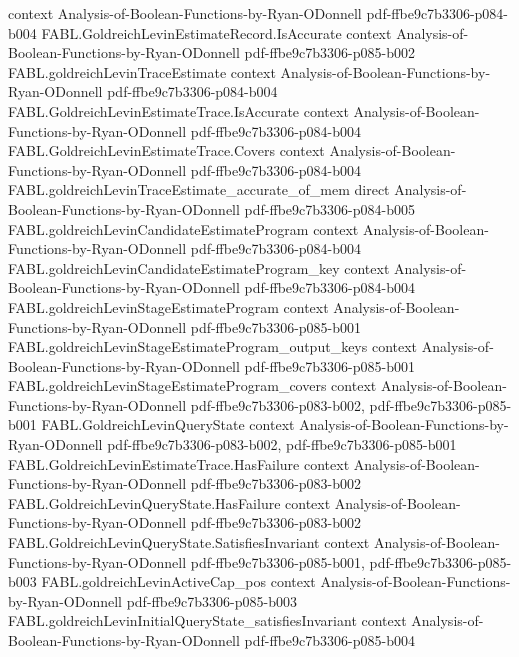 \begin{theorem}
  {context}
  {Analysis-of-Boolean-Functions-by-Ryan-ODonnell}
  {pdf-ffbe9c7b3306-p084-b004}
\proofstep
  {FABL.GoldreichLevinEstimateRecord.IsAccurate}
  {context}
  {Analysis-of-Boolean-Functions-by-Ryan-ODonnell}
  {pdf-ffbe9c7b3306-p085-b002}
\proofstep
  {FABL.goldreichLevinTraceEstimate}
  {context}
  {Analysis-of-Boolean-Functions-by-Ryan-ODonnell}
  {pdf-ffbe9c7b3306-p084-b004}
\proofstep
  {FABL.GoldreichLevinEstimateTrace.IsAccurate}
  {context}
  {Analysis-of-Boolean-Functions-by-Ryan-ODonnell}
  {pdf-ffbe9c7b3306-p084-b004}
\proofstep
  {FABL.GoldreichLevinEstimateTrace.Covers}
  {context}
  {Analysis-of-Boolean-Functions-by-Ryan-ODonnell}
  {pdf-ffbe9c7b3306-p084-b004}
\proofstep
  {FABL.goldreichLevinTraceEstimate_accurate_of_mem}
  {direct}
  {Analysis-of-Boolean-Functions-by-Ryan-ODonnell}
  {pdf-ffbe9c7b3306-p084-b005}
\proofstep
  {FABL.goldreichLevinCandidateEstimateProgram}
  {context}
  {Analysis-of-Boolean-Functions-by-Ryan-ODonnell}
  {pdf-ffbe9c7b3306-p084-b004}
\proofstep
  {FABL.goldreichLevinCandidateEstimateProgram_key}
  {context}
  {Analysis-of-Boolean-Functions-by-Ryan-ODonnell}
  {pdf-ffbe9c7b3306-p084-b004}
\proofstep
  {FABL.goldreichLevinStageEstimateProgram}
  {context}
  {Analysis-of-Boolean-Functions-by-Ryan-ODonnell}
  {pdf-ffbe9c7b3306-p085-b001}
\proofstep
  {FABL.goldreichLevinStageEstimateProgram_output_keys}
  {context}
  {Analysis-of-Boolean-Functions-by-Ryan-ODonnell}
  {pdf-ffbe9c7b3306-p085-b001}
\proofstep
  {FABL.goldreichLevinStageEstimateProgram_covers}
  {context}
  {Analysis-of-Boolean-Functions-by-Ryan-ODonnell}
  {pdf-ffbe9c7b3306-p083-b002,
    pdf-ffbe9c7b3306-p085-b001}
\proofstep
  {FABL.GoldreichLevinQueryState}
  {context}
  {Analysis-of-Boolean-Functions-by-Ryan-ODonnell}
  {pdf-ffbe9c7b3306-p083-b002,
    pdf-ffbe9c7b3306-p085-b001}
\proofstep
  {FABL.GoldreichLevinEstimateTrace.HasFailure}
  {context}
  {Analysis-of-Boolean-Functions-by-Ryan-ODonnell}
  {pdf-ffbe9c7b3306-p083-b002}
\proofstep
  {FABL.GoldreichLevinQueryState.HasFailure}
  {context}
  {Analysis-of-Boolean-Functions-by-Ryan-ODonnell}
  {pdf-ffbe9c7b3306-p083-b002}
\proofstep
  {FABL.GoldreichLevinQueryState.SatisfiesInvariant}
  {context}
  {Analysis-of-Boolean-Functions-by-Ryan-ODonnell}
  {pdf-ffbe9c7b3306-p085-b001,
    pdf-ffbe9c7b3306-p085-b003}
\proofstep
  {FABL.goldreichLevinActiveCap_pos}
  {context}
  {Analysis-of-Boolean-Functions-by-Ryan-ODonnell}
  {pdf-ffbe9c7b3306-p085-b003}
\proofstep
  {FABL.goldreichLevinInitialQueryState_satisfiesInvariant}
  {context}
  {Analysis-of-Boolean-Functions-by-Ryan-ODonnell}
  {pdf-ffbe9c7b3306-p085-b004}

\end{theorem}
